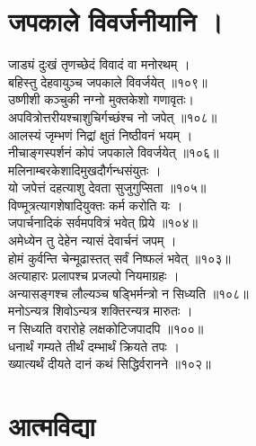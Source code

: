 \section{जपकाले विवर्जनीयानि ।}

जाड्यं दुःखं तृणच्छेदं विवादं वा मनोरथम् ।\\[-2mm]
बहिस्तु देहवायुञ्च जपकाले विवर्जयेत् ॥१०९॥\\
उष्णीशी कञ्चुकी नग्नो मुक्तकेशो गणावृतः।\\[-2mm]
अपवित्रोत्तरीयश्चाशुचिर्गच्छंश्च नो जपेत् ॥१०८॥\\
आलस्यं जृम्भणं निद्रां क्षुतं निष्ठीवनं भयम् ।\\[-2mm]
नीचाङ्गस्पर्शनं कोपं जपकाले विवर्जयेत् ॥१०६॥\\
मलिनाम्बरकेशादिमुखदौर्गन्धसंयुतः ।\\[-2mm]
यो जपेत्तं दहत्याशु देवता सुजुगुप्सिता ॥१०५॥\\
विण्मूत्रत्यागशेषादियुक्तः कर्म करोति यः ।\\[-2mm]
जपार्चनादिकं सर्वमपवित्रं भवेत् प्रिये ॥१०४॥\\
अमेध्येन तु देहेन न्यासं देवार्चनं जपम् ।\\[-2mm]
होमं कुर्वन्ति चेन्मूढास्तत् सर्वं निष्फलं भवेत् ॥१०३॥\\
अत्याहारः प्रलापश्च प्रजल्पो नियमाग्रहः ।\\[-2mm]
अन्यासङ्गश्च लौल्यञ्च षड्भिर्मन्त्रो न सिध्यति ॥१०८॥\\
मनोऽन्यत्र शिवोऽन्यत्र शक्तिरन्यत्र मारुतः ।\\[-2mm]
न सिध्यति वरारोहे लक्षकोटिजपादपि ॥१००॥\\
धनार्थं गम्यते तीर्थं दम्भार्थं क्रियते तपः ।\\[-2mm]
ख्यात्यर्थं दीयते दानं कथं सिद्धिर्वरानने ॥१०२॥\\


\section{आत्मविद्या}

